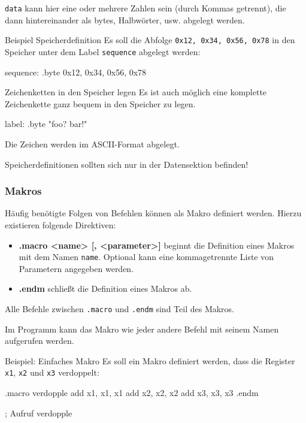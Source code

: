 \texttt{data} kann hier eine oder mehrere Zahlen sein (durch Kommas getrennt), die dann hintereinander als bytes, Halbwörter, usw. abgelegt werden.

\begin{exampleblock}{Beispiel Speicherdefinition}
	Es soll die Abfolge \texttt{0x12, 0x34, 0x56, 0x78} in den Speicher unter dem Label \texttt{sequence} abgelegt werden:
	\begin{riscv}
		sequence: .byte 0x12, 0x34, 0x56, 0x78
	\end{riscv}
\end{exampleblock}

\begin{infoblock}{Zeichenketten in den Speicher legen}
	Es ist auch möglich eine komplette Zeichenkette ganz bequem in den Speicher zu legen.
	\begin{riscv}
		label: .byte "foo? bar!"
	\end{riscv}
	Die Zeichen werden im ASCII-Format abgelegt.
\end{infoblock}

\begin{warningblock}
	Speicherdefinitionen sollten sich nur in der Datensektion befinden!
\end{warningblock}

\subsubsection{Makros}

Häufig benötigte Folgen von Befehlen können als Makro definiert werden. Hierzu
existieren folgende Direktiven:

\begin{itemize}
	\item \textbf{.macro <name> [, <parameter>]} beginnt die Definition eines
	Makros mit dem Namen \texttt{name}. Optional kann eine kommagetrennte Liste
	von Parametern angegeben werden.
	\item \textbf{.endm} schließt die Definition eines Makros ab.
\end{itemize}

Alle Befehle zwischen \texttt{.macro} und \texttt{.endm} sind Teil des Makros.

Im Programm kann das Makro wie jeder andere Befehl mit seinem Namen aufgerufen
werden.

\begin{exampleblock}{Beispiel: Einfaches Makro}
	Es soll ein Makro definiert werden, dass die Register \texttt{x1}, \texttt{x2}
	und \texttt{x3} verdoppelt:
	\begin{riscv}
		.macro verdopple
		add x1, x1, x1
		add x2, x2, x2
		add x3, x3, x3
		.endm

		; Aufruf
		verdopple
	\end{riscv}
\end{exampleblock}

